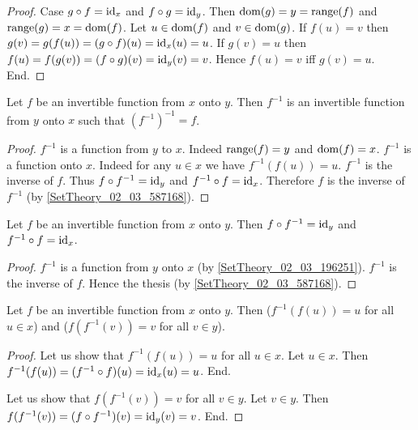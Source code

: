 \documentclass[../../set-theory.ftl.tex]{subfiles}
\begin{document}
\begin{forthel}
\begin{proof}
      Case $g \circ f = \operatorname{id}_{x}$ and $f \circ g = \operatorname{id}_{y}$.
        Then $\operatorname{dom}(g) = y = \operatorname{range}(f)$ and $\operatorname{range}(g) = x = \operatorname{dom}(f)$.
        Let $u \in \operatorname{dom}(f)$ and $v \in \operatorname{dom}(g)$.
        If $f(u) = v$ then $g(v) = g(f(u)) = (g \circ f)(u) = \operatorname{id}_{x}(u) = u$.
        If $g(v) = u$ then $f(u) = f(g(v)) = (f \circ g)(v) = \operatorname{id}_{y}(v) = v$.
        Hence $f(u) = v$ iff $g(v) = u$.
      End.
    \end{proof}

    \begin{proposition}\label{SetTheory_02_03_196251}
      Let $f$ be an invertible function from $x$ onto $y$.
      Then $f^{-1}$ is an invertible function from $y$ onto $x$ such that $(f^{-1})^{-1} = f$.
    \end{proposition}
    \begin{proof}
      $f^{-1}$ is a function from $y$ to $x$.
      Indeed $\operatorname{range}(f) = y$ and $\operatorname{dom}(f) = x$.
      $f^{-1}$ is a function onto $x$.
      Indeed for any $u \in x$ we have $f^{-1}(f(u)) = u$.
      $f^{-1}$ is the inverse of $f$.
      Thus $f \circ f^{-1} = \operatorname{id}_{y}$ and $f^{-1} \circ f = \operatorname{id}_{x}$.
      Therefore $f$ is the inverse of $f^{-1}$ (by \ref{SetTheory_02_03_587168}).
    \end{proof}

    \begin{proposition}\label{SetTheory_02_03_601485}
      Let $f$ be an invertible function from $x$ onto $y$.
      Then $f \circ f^{-1} = \operatorname{id}_{y}$ and $f^{-1} \circ f = \operatorname{id}_{x}$.
    \end{proposition}
    \begin{proof}
      $f^{-1}$ is a function from $y$ onto $x$ (by \ref{SetTheory_02_03_196251}).
      $f^{-1}$ is the inverse of $f$.
      Hence the thesis (by \ref{SetTheory_02_03_587168}).
    \end{proof}

    \begin{proposition}\label{SetTheory_02_03_173329}
      Let $f$ be an invertible function from $x$ onto $y$.
      Then ($f^{-1}(f(u)) = u$ for all $u \in x$) and ($f(f^{-1}(v)) = v$ for all $v \in y$).
    \end{proposition}
    \begin{proof}
      Let us show that  $f^{-1}(f(u)) = u$ for all $u \in x$.
        Let $u \in x$.
        Then $f^{-1}(f(u)) = (f^{-1} \circ f)(u) = \operatorname{id}_{x}(u) = u$.
      End.

      Let us show that $f(f^{-1}(v)) = v$ for all $v \in y$.
        Let $v \in y$.
        Then $f(f^{-1}(v)) = (f \circ f^{-1})(v) = \operatorname{id}_{y}(v) = v$.
      End.
    \end{proof}


\end{forthel}
\end{document}
